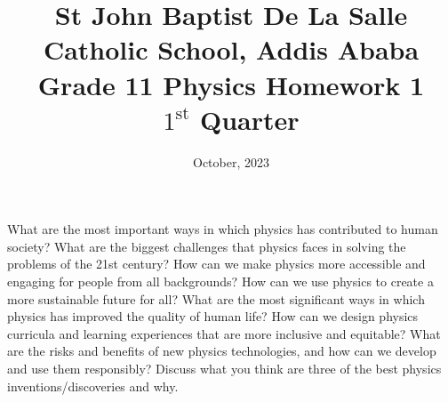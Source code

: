 \documentclass[12pt,addpoints]{exam}
\date{October, 2023}
\begin{document}
	\title{St John Baptist De La Salle Catholic School, Addis Ababa\\
		\large Grade 11 Physics Homework 1\\
		$1^\text{st}$ Quarter}
	\maketitle
				\begin{questions}
					\question What are the most important ways in which physics has contributed to human society?
					\question What are the biggest challenges that physics faces in solving the problems of the 21st century?
					\question How can we make physics more accessible and engaging for people from all backgrounds?
					\question How can we use physics to create a more sustainable future for all?
					\question What are the most significant ways in which physics has improved the quality of human life?
					\question How can we design physics curricula and learning experiences that are more inclusive and equitable?
					\question What are the risks and benefits of new physics technologies, and how can we develop and use them responsibly?
					\question Discuss what you think are three of the best physics inventions/discoveries and why.
					
				\end{questions}	
			
\end{document}
